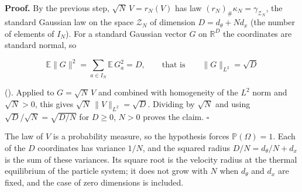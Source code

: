\documentclass[11pt,a4paper]{report}
\begin{document}
\textbf{Proof.} By the previous step, \(\sqrt N\,V=r_N(V)\) has law \((r_N)_\#\kappa_N=\gamma_{\mathcal Z_N}\), the standard Gaussian law on the space \(\mathcal Z_N\) of dimension \(D=d_\theta+Nd_x\) (the number of elements of \(I_N\)). For a standard Gaussian vector \(G\) on \(\mathbb R^D\) the coordinates are standard normal, so


\[\mathbb E\|G\|^2=\sum_{a\in I_N}\mathbb E\,G_a^2=D,\qquad\text{that is}\qquad\|G\|_{L^2}=\sqrt D\]


(\cite[Section~3.40.1]{LangevinLean2026Kinetic}). Applied to \(G=\sqrt N\,V\) and combined with homogeneity of the \(L^2\) norm and \(\sqrt N>0\), this gives \(\sqrt N\,\|V\|_{L^2}=\sqrt D\). Dividing by \(\sqrt N\) and using \(\sqrt D/\sqrt N=\sqrt{D/N}\) for \(D\ge0\), \(N>0\) proves the claim. \(\square\)




The law of \(V\) is a probability measure, so the hypothesis forces \(\mathbb P(\Omega)=1\). Each of the \(D\) coordinates has variance \(1/N\), and the squared radius \(D/N=d_\theta/N+d_x\) is the sum of these variances. Its square root is the velocity radius at the thermal equilibrium of the particle system; it does not grow with \(N\) when \(d_\theta\) and \(d_x\) are fixed, and the case of zero dimensions is included.
\end{document}

